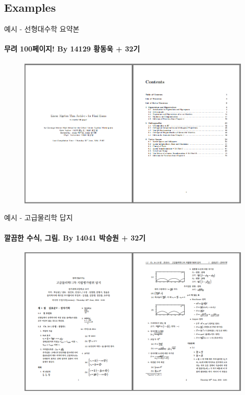 \documentclass[12pt]{beamer}
\begin{document}
\subsection{Examples}
\begin{frame}{예시 - 선형대수학 요약본}
	\framesubtitle{무려 100페이지! By 14129 황동욱 + 32기}
	\begin{figure}[h]
		\centering
		\includegraphics[width=\textwidth]{ex_linearalgebra.png}
	\end{figure}
\end{frame}
\begin{frame}{예시 - 고급물리학 답지}
	\framesubtitle{깔끔한 수식, 그림. By 14041 박승원 + 32기}
	\begin{figure}[h]
		\centering
		\includegraphics[width=\textwidth]{ex_advphysics.png}
	\end{figure}
\end{frame}
\end{document}
